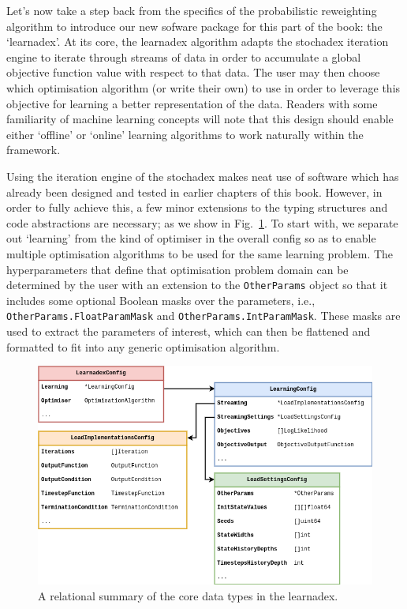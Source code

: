 Let's now take a step back from the specifics of the probabilistic reweighting algorithm to introduce our new sofware package for this part of the book: the `learnadex'. At its core, the learnadex algorithm adapts the stochadex iteration engine to iterate through streams of data in order to accumulate a global objective function value with respect to that data. The user may then choose which optimisation algorithm (or write their own) to use in order to leverage this objective for learning a better representation of the data. Readers with some familiarity of machine learning concepts will note that this design should enable either `offline' or `online' learning algorithms to work naturally within the framework.

Using the iteration engine of the stochadex makes neat use of software which has already been designed and tested in earlier chapters of this book. However, in order to fully achieve this, a few minor extensions to the typing structures and code abstractions are necessary; as we show in Fig.~\ref{fig:learnadex-data-types-design}. To start with, we separate out `learning' from the kind of optimiser in the overall config so as to enable multiple optimisation algorithms to be used for the same learning problem. The hyperparameters that define that optimisation problem domain can be determined by the user with an extension to the \texttt{OtherParams} object so that it includes some optional Boolean masks over the parameters, i.e., \texttt{OtherParams.FloatParamMask} and \texttt{OtherParams.IntParamMask}. These masks are used to extract the parameters of interest, which can then be flattened and formatted to fit into any generic optimisation algorithm.

\begin{figure}[h]
\centering
\includegraphics[width=12cm]{images/chapter-4-learnadex-data-types.drawio.png}
\caption{A relational summary of the core data types in the learnadex.}
\label{fig:learnadex-data-types-design}
\end{figure}

